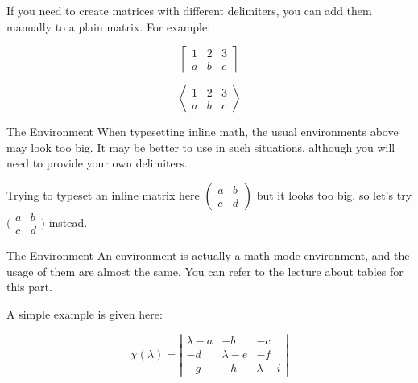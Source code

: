 \begin{frame}[fragile]
If you need to create matrices with different delimiters, you can add them manually to a plain matrix. For example:

\begin{latexexamplesplit}
\begin{equation}
  \left\lceil
  \begin{matrix}
    1 & 2 & 3 \\
    a & b & c
    \end{matrix}
  \right\rceil
\end{equation}

\begin{equation}
  \left\langle
  \begin{matrix}
    1 & 2 & 3 \\
    a & b & c
  \end{matrix}
  \right\rangle
\end{equation}
\end{latexexamplesplit}

\end{frame}

\begin{frame}[fragile]{The  Environment}
When typesetting inline math, the usual  environments above may look too big. It may be better to use  in such situations, although you will need to provide your own delimiters.

\begin{latexexample}
Trying to typeset an inline matrix here
$\begin{pmatrix}
  a & b \\ 
  c & d
\end{pmatrix}$ 
but it looks too big, so let's try 
$\big(\begin{smallmatrix}
  a & b \\
  c & d
\end{smallmatrix}\big)$ instead.
\end{latexexample}

\end{frame}

\begin{frame}[fragile]{The  Environment}
An  environment is actually a math mode  environment, and the usage of them are almost the same. You can refer to the lecture about tables for this part. \medskip

A simple example is given here:
\begin{latexexamplesplit}
\begin{equation}
  \chi(\lambda) = 
  \left| \begin{array}{ccc}
    \lambda - a & -b & -c \\
    -d & \lambda - e & -f \\
    -g & -h & \lambda - i 
  \end{array} \right|
\end{equation}
\end{latexexamplesplit}

\end{frame}



